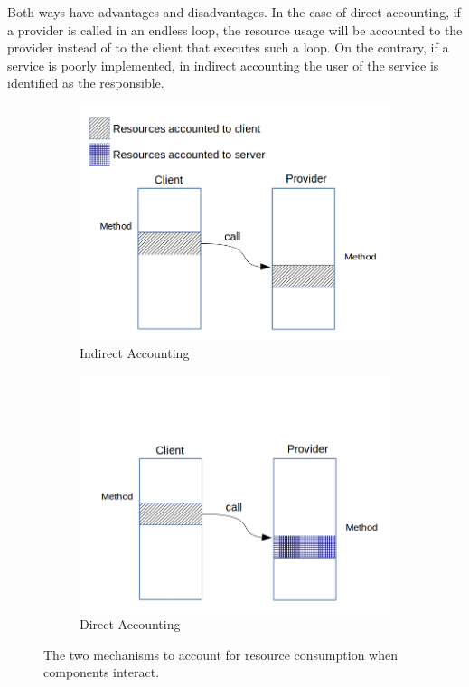 Both ways have advantages and disadvantages.
In the case of direct accounting, if a provider is
called in an endless loop, the resource usage will be accounted
to the provider instead of to the client that executes such a loop.
On the contrary, if a service is poorly implemented, in indirect accounting the user of the service is identified as the responsible.

\begin{figure}[ht]
\begin{subfigure}{0.45\textwidth}
\centering
\includegraphics[scale=0.35]{./chapter2/fig/indirect-accounting.png}
\caption{Indirect Accounting}\label{fig:indirect-accounting}
\end{subfigure}
\hspace{0.6cm}
\begin{subfigure}{0.45\textwidth}
\centering
\includegraphics[scale=0.35]{./chapter2/fig/direct-accounting.png}
\caption{Direct Accounting}\label{fig:direct-accounting}
\end{subfigure}
\caption{The two mechanisms to account for resource consumption when components interact.} \label{fig:accounting-methods}
\end{figure}


